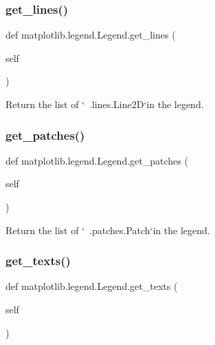 \subsubsection{\texorpdfstring{get\+\_\+lines()}{get\_lines()}}
{\footnotesize\ttfamily def matplotlib.\+legend.\+Legend.\+get\+\_\+lines (\begin{DoxyParamCaption}\item[{}]{self }\end{DoxyParamCaption})}

\begin{DoxyVerb}Return the list of `~.lines.Line2D`\s in the legend.\end{DoxyVerb}
 \mbox{\label{classmatplotlib_1_1legend_1_1Legend_ae1512f658876dfc0a90e97641c88a09b}} 
\subsubsection{\texorpdfstring{get\+\_\+patches()}{get\_patches()}}
{\footnotesize\ttfamily def matplotlib.\+legend.\+Legend.\+get\+\_\+patches (\begin{DoxyParamCaption}\item[{}]{self }\end{DoxyParamCaption})}

\begin{DoxyVerb}Return the list of `~.patches.Patch`\s in the legend.\end{DoxyVerb}
 \mbox{\label{classmatplotlib_1_1legend_1_1Legend_a1d1b37102f56cea3509e563035964460}} 
\subsubsection{\texorpdfstring{get\+\_\+texts()}{get\_texts()}}
{\footnotesize\ttfamily def matplotlib.\+legend.\+Legend.\+get\+\_\+texts (\begin{DoxyParamCaption}\item[{}]{self }\end{DoxyParamCaption})}


